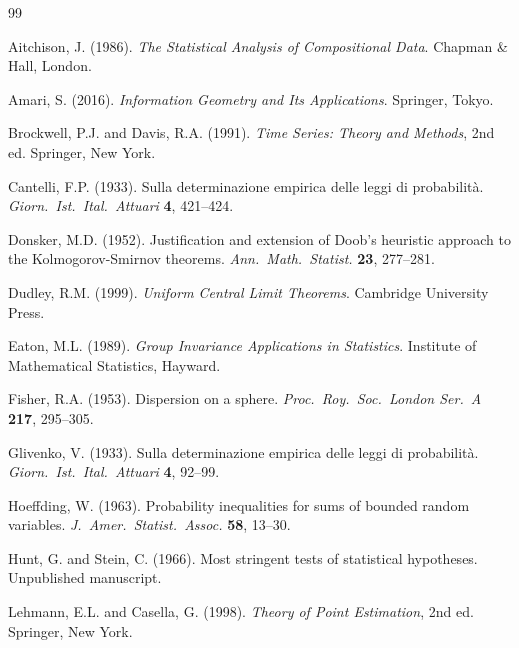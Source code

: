\documentclass[11pt]{article}
\begin{document}



\begin{thebibliography}{99}

Aitchison, J. (1986).
\textit{The Statistical Analysis of Compositional Data}.
Chapman \& Hall, London.

Amari, S. (2016).
\textit{Information Geometry and Its Applications}.
Springer, Tokyo.

Brockwell, P.J. and Davis, R.A. (1991).
\textit{Time Series: Theory and Methods}, 2nd ed.
Springer, New York.

Cantelli, F.P. (1933).
Sulla determinazione empirica delle leggi di probabilit\`a.
\textit{Giorn.\ Ist.\ Ital.\ Attuari} \textbf{4}, 421--424.

Donsker, M.D. (1952).
Justification and extension of Doob's heuristic approach to the Kolmogorov-Smirnov theorems.
\textit{Ann.\ Math.\ Statist.} \textbf{23}, 277--281.

Dudley, R.M. (1999).
\textit{Uniform Central Limit Theorems}.
Cambridge University Press.

Eaton, M.L. (1989).
\textit{Group Invariance Applications in Statistics}.
Institute of Mathematical Statistics, Hayward.

Fisher, R.A. (1953).
Dispersion on a sphere.
\textit{Proc.\ Roy.\ Soc.\ London Ser.\ A} \textbf{217}, 295--305.

Glivenko, V. (1933).
Sulla determinazione empirica delle leggi di probabilit\`a.
\textit{Giorn.\ Ist.\ Ital.\ Attuari} \textbf{4}, 92--99.

Hoeffding, W. (1963).
Probability inequalities for sums of bounded random variables.
\textit{J.\ Amer.\ Statist.\ Assoc.} \textbf{58}, 13--30.

Hunt, G. and Stein, C. (1966).
Most stringent tests of statistical hypotheses.
Unpublished manuscript.

Lehmann, E.L. and Casella, G. (1998).
\textit{Theory of Point Estimation}, 2nd ed.
Springer, New York.


\end{thebibliography}
\end{document}
